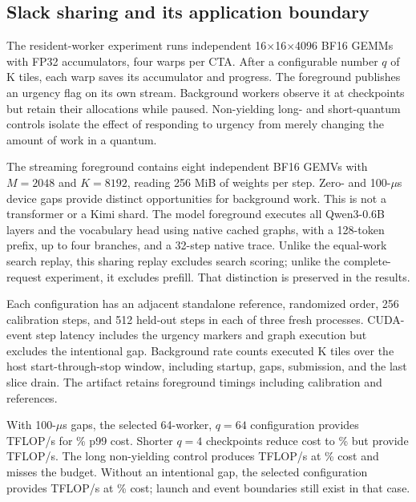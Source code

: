 \subsection{Slack sharing and its application boundary}
The resident-worker experiment runs independent 16$\times$16$\times$4096
BF16 GEMMs with FP32 accumulators, four warps per CTA. After a configurable
number $q$ of K tiles, each warp saves its accumulator and progress. The
foreground publishes an urgency flag on its own stream. Background workers
observe it at checkpoints but retain their allocations while paused.
Non-yielding long- and short-quantum controls isolate the effect of responding
to urgency from merely changing the amount of work in a quantum.

The streaming foreground contains eight independent BF16 GEMVs with
$M=2048$ and $K=8192$, reading 256 MiB of weights per step. Zero- and
100-$\mu$s device gaps provide distinct opportunities for background work.
This is not a transformer or a Kimi shard. The model foreground executes
all Qwen3-0.6B layers and the vocabulary head using native cached graphs,
with a 128-token prefix, up to four branches, and a 32-step native trace.
Unlike the equal-work search replay, this sharing replay excludes search
scoring; unlike the complete-request experiment, it excludes prefill. That distinction is preserved in the results.

Each configuration has an adjacent standalone reference, randomized order,
256 calibration steps, and 512 held-out steps in each of three fresh
processes. CUDA-event step latency includes the urgency markers and graph
execution but excludes the intentional gap. Background rate counts executed
K tiles over the host start-through-stop window, including startup, gaps,
submission, and the last slice drain. The artifact retains
\slackTimedSteps{} foreground timings including calibration and references.



With 100-$\mu$s gaps, the selected 64-worker, $q=64$ configuration provides
\slackProxyMediumRate{} TFLOP/s for \slackProxyMediumCost\% p99 cost.
Shorter $q=4$ checkpoints reduce cost to \slackProxyShortCost\% but provide
\slackProxyShortRate{} TFLOP/s. The long non-yielding control produces
\slackProxyLongRate{} TFLOP/s at \slackProxyLongCost\% cost and misses
the budget. Without an intentional gap, the selected configuration provides
\slackContinuousRate{} TFLOP/s at \slackContinuousCost\% cost; launch
and event boundaries still exist in that case.

